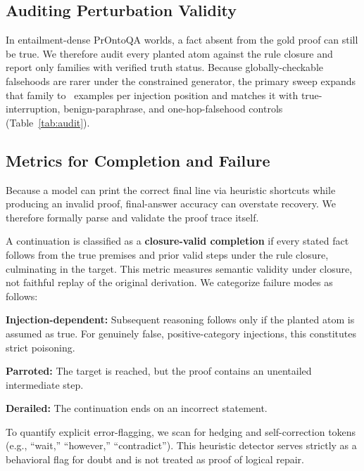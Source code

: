 \documentclass{article}
\begin{document}
\subsection{Auditing Perturbation Validity}
\label{sec:audit}
In entailment-dense PrOntoQA worlds, a fact absent from the gold proof can still be
true. We therefore audit every planted atom against the rule closure and report only
families with verified truth status. Because globally-checkable falsehoods are rarer
under the constrained generator, the primary sweep expands that family to
\ExpansionTargetPerPosition\ examples per injection position and matches it with
true-interruption, benign-paraphrase, and one-hop-falsehood controls
(Table~\ref{tab:audit}).

\begin{table}[h]
\centering\scriptsize
\PaperTableExpansion
\caption{Expanded audited primary PrOntoQA perturbation set. Each condition pools
three injection positions (\ExpansionTargetPerPosition\ examples per position);
confidence intervals are problem-cluster bootstrap intervals.}
\label{tab:audit}
\end{table}

\subsection{Metrics for Completion and Failure}
\label{sec:metrics}
Because a model can print the correct final line via heuristic shortcuts while
producing an invalid proof, final-answer accuracy can overstate recovery. We therefore
formally parse and validate the proof trace itself.

A continuation is classified as a \textbf{closure-valid completion} if every stated
fact follows from the true premises and prior valid steps under the rule closure,
culminating in the target. This metric measures semantic validity under closure, not
faithful replay of the original derivation. We categorize failure modes as follows:

\noindent\textbf{Injection-dependent:} Subsequent reasoning follows only if the planted
atom is assumed as true. For genuinely false, positive-category injections, this
constitutes strict poisoning.

\noindent\textbf{Parroted:} The target is reached, but the proof contains an unentailed
intermediate step.

\noindent\textbf{Derailed:} The continuation ends on an incorrect statement.

To quantify explicit error-flagging, we scan for hedging and self-correction tokens
(e.g., ``wait,'' ``however,'' ``contradict''). This heuristic detector serves strictly
as a behavioral flag for doubt and is not treated as proof of logical repair.
\end{document}

